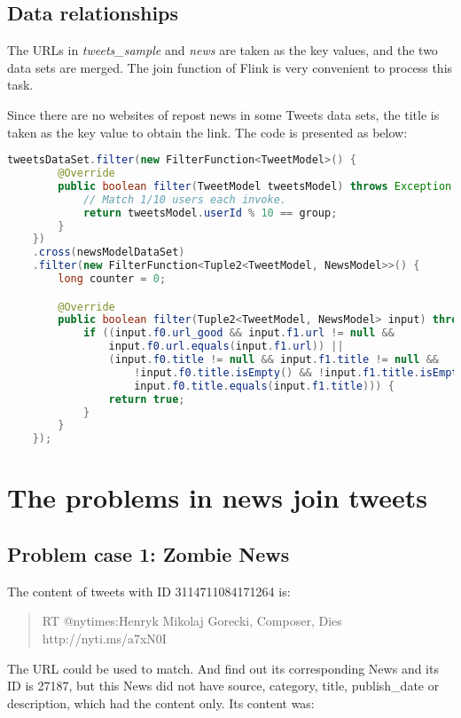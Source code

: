 \subsection{Data relationships}
The URLs in \textit{tweets\_sample} and \textit{news} are taken as the key values, and the two data sets are merged. The join function of Flink is very convenient to process this task.

Since there are no websites of repost news in some Tweets data sets, the title is taken as the key value to obtain the link. The code is presented as below:

\begin{lstlisting}[language=Java]
tweetsDataSet.filter(new FilterFunction<TweetModel>() {
		@Override
		public boolean filter(TweetModel tweetsModel) throws Exception {
			// Match 1/10 users each invoke.
			return tweetsModel.userId % 10 == group;
		}
	})
	.cross(newsModelDataSet)
	.filter(new FilterFunction<Tuple2<TweetModel, NewsModel>>() {
		long counter = 0;

		@Override
		public boolean filter(Tuple2<TweetModel, NewsModel> input) throws Exception {
			if ((input.f0.url_good && input.f1.url != null &&
				input.f0.url.equals(input.f1.url)) ||
				(input.f0.title != null && input.f1.title != null &&
					!input.f0.title.isEmpty() && !input.f1.title.isEmpty() &&
					input.f0.title.equals(input.f1.title))) {
				return true;
			}
		}
	});
\end{lstlisting}

\section{The problems in news join tweets}

\subsection{Problem case 1: Zombie News}

The content of tweets with ID 3114711084171264 is:

\begin{quote}
RT @nytimes:Henryk Mikolaj Gorecki, Composer, Dies http://nyti.ms/a7xN0I
\end{quote}

The URL could be used to match. And find out its corresponding News and its ID is 27187, but this News did not have source, category, title, publish\_date or description, which had the content only. Its content was: 

